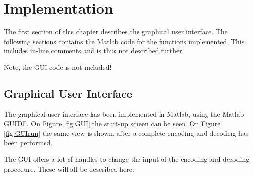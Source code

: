 \documentclass[MiniProjectMain]{subfiles}
\begin{document}
\chapter{Implementation}
The first section of this chapter describes the graphical user interface. 
The following sections contains the Matlab code for the functions implemented. 
This includes in-line comments and is thus not described further. 

Note, the GUI code is not included!

\section{Graphical User Interface}
The graphical user interface has been implemented in Matlab, using the Matlab GUIDE. On Figure \ref{fig:GUI} the start-up screen can be seen. On Figure \ref{fig:GUIrun} the same view is shown, after a complete encoding and decoding has been performed. 

The GUI offers a lot of handles to change the input of the encoding and decoding procedure. These will all be described here:
\end{document}
